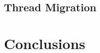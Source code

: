 \documentclass[a4paper]{article}
\begin{document}
\subsection{\textbf{Thread Migration}}

\newpage
\section{\textbf{Conclusions}}








\newpage


\end{document}

